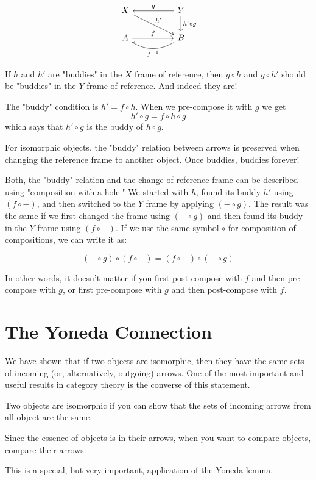 \documentclass[DaoFP]{subfiles}
\begin{document}
\[
 \begin{tikzcd}
 X
 \arrow[drr, "h'"]
 && Y
 \arrow[ll, "g"']
  \arrow[d, "h' \circ g"]
 \\
 A
 \arrow[rr, "f"]
  && B
 \arrow[ll, bend left,  "f^{-1}"]
 \end{tikzcd}
\]

If $h$ and $h'$ are "buddies" in the $X$ frame of reference, then $g \circ h$ and $g \circ h'$ should be "buddies" in the $Y$ frame of reference. And indeed they are! 

The "buddy" condition is $h' = f \circ h$. When we pre-compose it with $g$ we get
\[h'  \circ g = f \circ h \circ g\]
which says that $h' \circ g$ is the buddy of $h \circ g$. 

For isomorphic objects, the "buddy" relation between arrows is preserved when changing the reference frame to another object. Once buddies, buddies forever!

Both, the "buddy" relation and the change of reference frame can be described using "composition with a hole." We started with $h$, found its buddy $h'$ using $(f \circ -)$, and then switched to the $Y$ frame by applying $(- \circ g)$. The result was the same if we first changed the frame using $(- \circ g)$ and then found its buddy in the $Y$ frame using $(f \circ -)$. If we use the same symbol $\circ$ for composition of compositions, we can write it as:

\[(- \circ g) \circ (f \circ -) = (f \circ -) \circ (- \circ g)\]

In other words, it doesn't matter if you first post-compose with $f$ and then pre-compose with $g$, or first pre-compose with $g$ and then post-compose with $f$. 

\section{The Yoneda Connection}

We have shown that if two objects are isomorphic, then they have the same sets of incoming (or, alternatively, outgoing) arrows. One of the most important and useful results in category theory is the converse of this statement. 

Two objects are isomorphic if you can show that the sets of incoming arrows from all object are the same. 

Since the essence of objects is in their arrows, when you want to compare objects, compare their arrows.

This is a special, but very important, application of the Yoneda lemma.
\end{document}
